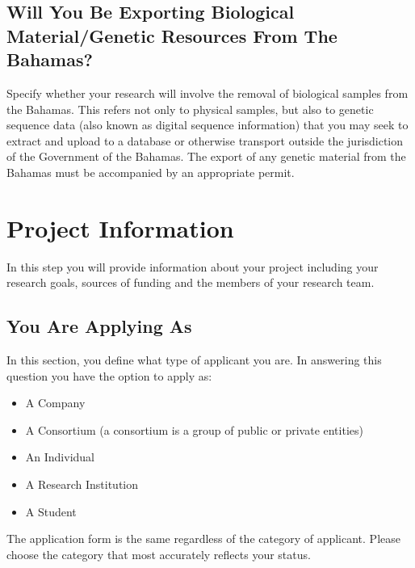 \documentclass[
]{book}
\providecommand{\tightlist}{%
  \setlength{\itemsep}{0pt}\setlength{\parskip}{0pt}}
\begin{document}
\hypertarget{will-you-be-exporting-biological-materialgenetic-resources-from-the-bahamas}{%
\section{Will You Be Exporting Biological Material/Genetic Resources From The Bahamas?}\label{will-you-be-exporting-biological-materialgenetic-resources-from-the-bahamas}}

Specify whether your research will involve the removal of biological samples from the Bahamas. This refers not only to physical samples, but also to genetic sequence data (also known as digital sequence information) that you may seek to extract and upload to a database or otherwise transport outside the jurisdiction of the Government of the Bahamas. The export of any genetic material from the Bahamas must be accompanied by an appropriate permit.

\hypertarget{project-information}{%
\chapter{Project Information}\label{project-information}}

In this step you will provide information about your project including your research goals, sources of funding and the members of your research team.

\hypertarget{you-are-applying-as}{%
\section{You Are Applying As}\label{you-are-applying-as}}

In this section, you define what type of applicant you are. In answering this question you have the option to apply as:

\begin{itemize}
\tightlist
\item
  A Company
\item
  A Consortium (a consortium is a group of public or private entities)
\item
  An Individual
\item
  A Research Institution
\item
  A Student
\end{itemize}

The application form is the same regardless of the category of applicant. Please choose the category that most accurately reflects your status.
\end{document}
